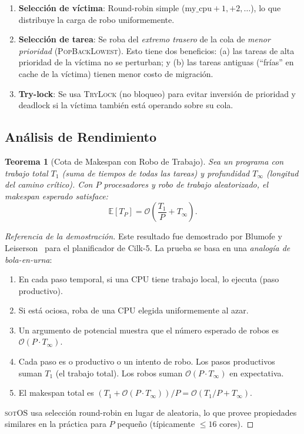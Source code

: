 \documentclass[11pt,twoside,openright]{book}
\theoremstyle{definition}
\theoremstyle{plain}
\newtheorem{theorem}{Teorema}[chapter]
\theoremstyle{remark}
\newcommand{\sotos}{\textsc{sotOS}}
\newcommand{\bigO}{\mathcal{O}}
\begin{document}
\begin{enumerate}
    \item \textbf{Selección de víctima}: Round-robin simple ($\text{my\_cpu} + 1, +2, \ldots$),
          lo que distribuye la carga de robo uniformemente.
    \item \textbf{Selección de tarea}: Se roba del \emph{extremo trasero} de la cola de
          \emph{menor prioridad} (\textsc{PopBackLowest}). Esto tiene dos beneficios:
          (a) las tareas de alta prioridad de la víctima no se perturban; y
          (b) las tareas antiguas (``frías'' en cache de la víctima) tienen menor costo
          de migración.
    \item \textbf{Try-lock}: Se usa \textsc{TryLock} (no bloqueo) para evitar inversión
          de prioridad y deadlock si la víctima también está operando sobre su cola.
\end{enumerate}

\subsection{Análisis de Rendimiento}

\begin{theorem}[Cota de Makespan con Robo de Trabajo]
\label{thm:work-stealing}
Sea un programa con trabajo total $T_1$ (suma de tiempos de todas las tareas) y
profundidad $T_\infty$ (longitud del camino crítico). Con $P$ procesadores y robo de
trabajo aleatorizado, el makespan esperado satisface:
\[
    \mathbb{E}[T_P] = \bigO\!\left(\frac{T_1}{P} + T_\infty\right).
\]
\end{theorem}

\begin{proof}[Referencia de la demostración]
Este resultado fue demostrado por Blumofe y Leiserson~\cite{blumofe1999} para el
planificador de Cilk-5. La prueba se basa en una \emph{analogía de bola-en-urna}:

\begin{enumerate}
    \item En cada paso temporal, si una CPU tiene trabajo local, lo ejecuta (paso productivo).
    \item Si está ociosa, roba de una CPU elegida uniformemente al azar.
    \item Un argumento de potencial muestra que el número esperado de robos es
          $\bigO(P \cdot T_\infty)$.
    \item Cada paso es o productivo o un intento de robo. Los pasos productivos suman
          $T_1$ (el trabajo total). Los robos suman $\bigO(P \cdot T_\infty)$ en expectativa.
    \item El makespan total es $(T_1 + \bigO(P \cdot T_\infty)) / P =
          \bigO(T_1/P + T_\infty)$.
\end{enumerate}

\sotos{} usa selección round-robin en lugar de aleatoria, lo que provee propiedades
similares en la práctica para $P$ pequeño (típicamente $\leq 16$ cores).
\end{proof}
\end{document}
